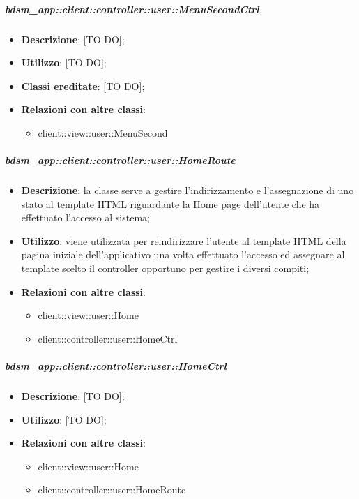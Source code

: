 		\subparagraph{bdsm\_app::client::controller::user::MenuSecondCtrl} %
		\label{subp:client_controller_user_menusecondctrl}
			\begin{itemize}
				\item \textbf{Descrizione}: [TO DO];
				\item \textbf{Utilizzo}: [TO DO];
				\item \textbf{Classi ereditate}: [TO DO];
				\item \textbf{Relazioni con altre classi}:
					\begin{itemize}
						\item client::view::user::MenuSecond
					\end{itemize}
			\end{itemize}




		\subparagraph{bdsm\_app::client::controller::user::HomeRoute} %
		\label{subp:bdsm_app_client_controller_user_homerouteconfig}
			\begin{itemize}
				\item \textbf{Descrizione}: la classe serve a gestire l'indirizzamento e l'assegnazione di uno stato al template HTML riguardante la Home page dell'utente che ha effettuato l'accesso al sistema;
				\item \textbf{Utilizzo}: viene utilizzata per reindirizzare l'utente al template HTML della pagina iniziale dell'applicativo una volta effettuato l'accesso ed assegnare al template scelto il controller opportuno per gestire i diversi compiti;
				\item \textbf{Relazioni con altre classi}:
					\begin{itemize}
						\item client::view::user::Home
						\item client::controller::user::HomeCtrl
					\end{itemize}
			\end{itemize}

		\subparagraph{bdsm\_app::client::controller::user::HomeCtrl} %
		\label{subp:client_controller_user_homectrl}
			\begin{itemize}
				\item \textbf{Descrizione}: [TO DO];
				\item \textbf{Utilizzo}: [TO DO];
				\item \textbf{Relazioni con altre classi}:
					\begin{itemize}
						\item client::view::user::Home
						\item client::controller::user::HomeRoute
					\end{itemize}
			\end{itemize}

